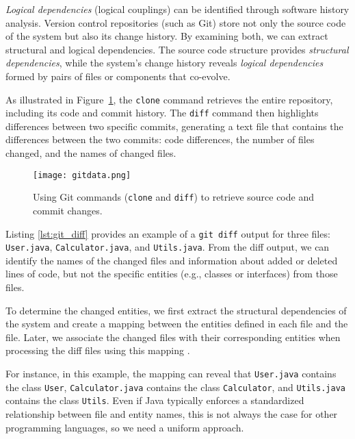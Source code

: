 \hspace{4em}\textit{Logical dependencies} (logical couplings) can be identified through software history analysis. Version control repositories (such as Git) store not only the source code of the system but also its change history. By examining both, we can extract structural and logical dependencies. The source code structure provides \textit{structural dependencies}, while the system’s change history reveals \textit{logical dependencies} formed by pairs of files or components that co-evolve.

As illustrated in Figure~\ref{fig:extracting_data_with_git}, the \texttt{clone} command retrieves the entire repository, including its code and commit history. The \texttt{diff} command then highlights differences between two specific commits, generating a text file that contains the differences between the two commits: code differences, the number of files changed, and the names of changed files.

\begin{figure}[H]
\centering
\texttt{[image: gitdata.png]}
\caption{Using Git commands (\texttt{clone} and \texttt{diff}) to retrieve source code and commit changes.}
\label{fig:extracting_data_with_git}
\end{figure}


Listing \ref{lst:git_diff} provides an example of a \texttt{git diff} output for three files: \texttt{User.java}, \texttt{Calculator.java}, and \texttt{Utils.java}. From the diff output, we can identify the names of the changed files and information about added or deleted lines of code, but not the specific entities (e.g., classes or interfaces) from those files. 

To determine the changed entities, we first extract the structural dependencies of the system and create a mapping between the entities defined in each file and the file. Later, we associate the changed files with their corresponding entities when processing the diff files using this mapping \cite{DepSACI, b4, icstcc-2024, enase19}. 

For instance, in this example, the mapping can reveal that \texttt{User.java} contains the class \texttt{User}, \texttt{Calculator.java} contains the class \texttt{Calculator}, and \texttt{Utils.java} contains the class \texttt{Utils}. Even if Java typically enforces a standardized relationship between file and entity names, this is not always the case for other programming languages, so we need a uniform approach.

